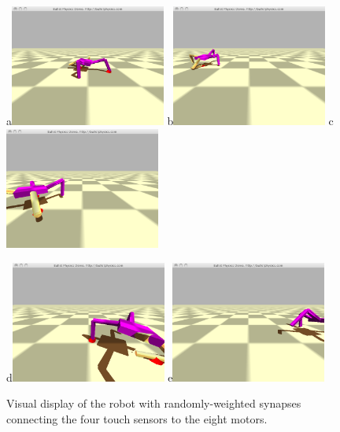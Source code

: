 \documentclass[12pt]{article}
\begin{document}
\begin{figure}
\centerline{
a\includegraphics[height=4cm]{Fig1a}
b\includegraphics[height=4cm]{Fig1b}
c\includegraphics[height=4cm]{Fig1c}}
\centerline{
d\includegraphics[height=4cm]{Fig1d}
e\includegraphics[height=4cm]{Fig1e}}
\caption{Visual display of the robot with randomly-weighted synapses connecting the four touch sensors to the eight motors.}
\label{Fig1}
\end{figure}
\end{document}

